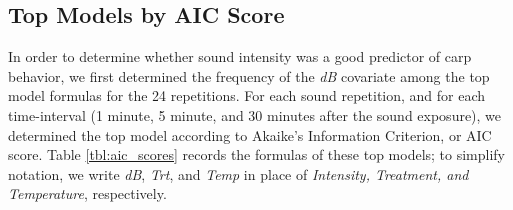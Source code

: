 \documentclass[12pt]{article}
\begin{document}
	\subsection{Top Models by AIC Score}
	
	In order to determine whether sound intensity was a good predictor of carp behavior, we first determined the frequency of the \emph{dB} covariate among the top model formulas for the 24 repetitions. For each sound repetition, and for each time-interval (1 minute, 5 minute, and 30 minutes after the sound exposure), we determined the top model according to Akaike's Information Criterion, or AIC score. Table \ref{tbl:aic_scores} records the formulas of these top models; to simplify notation, we write \emph{dB}, \emph{Trt}, and \emph{Temp} in place of \emph{Intensity, Treatment, and Temperature}, respectively.
	
\end{document}
